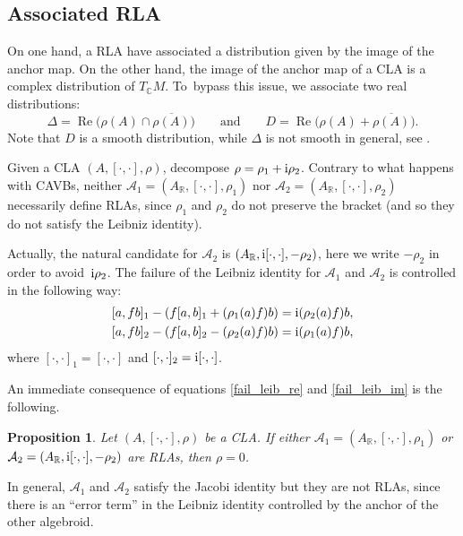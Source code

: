\documentclass[pdftex]{sigma}
\numberwithin{equation}{section}
\newtheorem{Proposition}[Theorem]{Proposition}
 { \theoremstyle{definition}
\newtheorem{Definition}[Theorem]{Definition}
\newtheorem{Note}[Theorem]{Note}
\newtheorem{Example}[Theorem]{Example}
\newtheorem{Examples}[Theorem]{Examples}
\newtheorem{Remark}[Theorem]{Remark} }
\newcommand{\R}{{\mathbb{R}}}
\newcommand{\C}{{\mathbb{C}}}
\DeclareMathOperator{\re}{Re}
\begin{document}
\subsection{Associated RLA}%
On one hand, a RLA have associated a distribution given by the image of the anchor map. On the other hand, the image of the anchor map of a CLA is a complex distribution of $T_{\C}M$. To~bypass this issue, we associate two real distributions:
\begin{equation}\label{real_distributions}
\Delta=\re \bigl(\rho(A)\cap \overline{\rho(A)}\bigr)\qquad\text{and} \qquad D=\re \bigl(\rho(A) + \overline{\rho(A)}\bigr).
\end{equation}
Note that $D$ is a smooth distribution, while $\Delta$ is not smooth in general, see \cite[Example 6.1]{aguero2022complex}.

Given a CLA $(A, [\cdot,\cdot], \rho)$, decompose $\rho=\rho_1+{\rm i}\rho_2$. Contrary to what happens with CAVBs, neither $\mathcal{A}_1=(A_{\R}, [\cdot,\cdot], \rho_1)$ nor $\mathcal{A}_2=(A_{\R}, [\cdot,\cdot],\rho_2)$ necessarily define RLAs, since $\rho_1$ and $\rho_2$ do not preserve the bracket (and so they do not satisfy the Leibniz identity).


Actually, the natural candidate for $\mathcal{A}_2$ is $(A_{\R}, {\rm i}[\cdot,\cdot], -\rho_2)$, here we write $-\rho_2$ in order to avoid~${\rm i}\rho_2$. The failure of the Leibniz identity for $\mathcal{A}_1$ and $\mathcal{A}_2$ is controlled in the following way:
  \begin{gather}\label{fail_leib_re}
  [a, fb]_1-(f[a,b]_1+(\rho_1(a)f)b)={\rm i}(\rho_2(a)f)b,
  \\ \label{fail_leib_im}
  [a, fb]_2-(f[a,b]_2-(\rho_2(a)f)b)={\rm i}(\rho_1(a)f)b,
  \end{gather}
  where $[\cdot,\cdot]_1=[\cdot,\cdot]$ and $[\cdot,\cdot]_2={\rm i}[\cdot,\cdot]$.

An immediate consequence of equations \eqref{fail_leib_re} and \eqref{fail_leib_im} is the following.
\begin{Proposition}
Let $(A, [\cdot,\cdot], \rho)$ be a CLA. If either $\mathcal{A}_1=(A_{\R}, [\cdot,\cdot], \rho_1)$ or $\mathcal{A}_2=(A_{\R}, {\rm i}[\cdot,\cdot], -\rho_2)$ are RLAs, then $\rho=0$.
\end{Proposition}

In general, $\mathcal{A}_1$ and $\mathcal{A}_2$ satisfy the Jacobi identity but they are not RLAs, since there is an ``error term'' in the Leibniz identity controlled by the anchor of the other algebroid.
\end{document}
